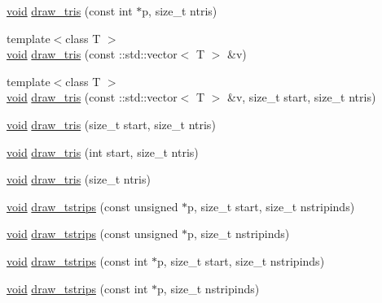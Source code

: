\begin{DoxyCompactItemize}
\item 
\hyperlink{namespacetrimesh_a784ddfd979e1c579bda795a8edfc3f43}{void} \hyperlink{classtrimesh_1_1GLManager_a342c96b698268a4792e06364b43a7ee8}{draw\+\_\+tris} (const int $\ast$p, size\+\_\+t ntris)
\item 
{\footnotesize template$<$class T $>$ }\\\hyperlink{namespacetrimesh_a784ddfd979e1c579bda795a8edfc3f43}{void} \hyperlink{classtrimesh_1_1GLManager_a8e5ead5311002e7a22e9cd5e5c8c8b06}{draw\+\_\+tris} (const \+::std\+::vector$<$ T $>$ \&v)
\item 
{\footnotesize template$<$class T $>$ }\\\hyperlink{namespacetrimesh_a784ddfd979e1c579bda795a8edfc3f43}{void} \hyperlink{classtrimesh_1_1GLManager_ac7a820234f068d00e3a43e6ef9c6d417}{draw\+\_\+tris} (const \+::std\+::vector$<$ T $>$ \&v, size\+\_\+t start, size\+\_\+t ntris)
\item 
\hyperlink{namespacetrimesh_a784ddfd979e1c579bda795a8edfc3f43}{void} \hyperlink{classtrimesh_1_1GLManager_aa9736018059ec4fee93cd38a60dbbe11}{draw\+\_\+tris} (size\+\_\+t start, size\+\_\+t ntris)
\item 
\hyperlink{namespacetrimesh_a784ddfd979e1c579bda795a8edfc3f43}{void} \hyperlink{classtrimesh_1_1GLManager_ad7eeb003f0ecbb29279a8e6965bf32c1}{draw\+\_\+tris} (int start, size\+\_\+t ntris)
\item 
\hyperlink{namespacetrimesh_a784ddfd979e1c579bda795a8edfc3f43}{void} \hyperlink{classtrimesh_1_1GLManager_a3a9f7a3ae3d26a6ef8b5227397cf40d9}{draw\+\_\+tris} (size\+\_\+t ntris)
\item 
\hyperlink{namespacetrimesh_a784ddfd979e1c579bda795a8edfc3f43}{void} \hyperlink{classtrimesh_1_1GLManager_a9340e640152b2209c57b4a2c9f0d259a}{draw\+\_\+tstrips} (const unsigned $\ast$p, size\+\_\+t start, size\+\_\+t nstripinds)
\item 
\hyperlink{namespacetrimesh_a784ddfd979e1c579bda795a8edfc3f43}{void} \hyperlink{classtrimesh_1_1GLManager_ae30c05f6d0470bf6c3b614cfb7c225c6}{draw\+\_\+tstrips} (const unsigned $\ast$p, size\+\_\+t nstripinds)
\item 
\hyperlink{namespacetrimesh_a784ddfd979e1c579bda795a8edfc3f43}{void} \hyperlink{classtrimesh_1_1GLManager_a8d750067e1ebc52f3cf056625996ec8a}{draw\+\_\+tstrips} (const int $\ast$p, size\+\_\+t start, size\+\_\+t nstripinds)
\item 
\hyperlink{namespacetrimesh_a784ddfd979e1c579bda795a8edfc3f43}{void} \hyperlink{classtrimesh_1_1GLManager_ad7ef3a9f8ba3ad546669f4774cee0b71}{draw\+\_\+tstrips} (const int $\ast$p, size\+\_\+t nstripinds)

\end{DoxyCompactItemize}
